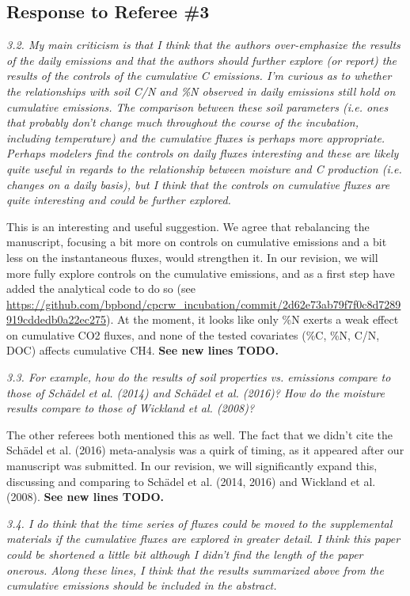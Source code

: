 \documentclass[11pt, oneside]{article}
\begin{document}
\newpage
\subsection*{Response to Referee \#3}

{\it 3.2. My main criticism is that I think that the authors over-emphasize the results of the daily emissions and that the authors should further explore (or report) the results of the controls of the cumulative C emissions. I'm curious as to whether the relationships with soil C/N and \%N observed in daily emissions still hold on cumulative emissions. The comparison between these soil parameters (i.e. ones that probably don't change much throughout the course of the incubation, including temperature) and the cumulative fluxes is perhaps more appropriate. Perhaps modelers find the controls on daily fluxes interesting and these are likely quite useful in regards to the relationship between moisture and C production (i.e. changes on a daily basis), but I think that the controls on cumulative fluxes are quite interesting and could be further explored. }

This is an interesting and useful suggestion. We agree that rebalancing the manuscript, focusing a bit more on controls on cumulative emissions and a bit less on the instantaneous fluxes, would strengthen it. In our revision, we will more fully explore controls on the cumulative emissions, and as a first step have added the analytical code to do so (see \url{https://github.com/bpbond/cpcrw_incubation/commit/2d62e73ab79f7f0c8d7289919cddedb0a22ec275}). At the moment, it looks like only \%N exerts a weak effect on cumulative CO2 fluxes, and none of the tested covariates (\%C, \%N, C/N, DOC) affects cumulative CH4. {\bf See new lines TODO.}

\medskip
{\it 3.3. For example, how do the results of soil properties vs. emissions compare to those of Schädel et al. (2014) and Schädel et al. (2016)? How do the moisture results compare to those of Wickland et al. (2008)? }

The other referees both mentioned this as well. The fact that we didn't cite the Schädel et al. (2016) meta-analysis was a quirk of timing, as it appeared after our manuscript was submitted. In our revision, we will significantly expand this, discussing and comparing to Schädel et al. (2014, 2016) and Wickland et al. (2008). {\bf See new lines TODO.}

\medskip
{\it 3.4. I do think that the time series of fluxes could be moved to the supplemental materials if the cumulative fluxes are explored in greater detail. I think this paper could be shortened a little bit although I didn't find the length of the paper onerous. Along these lines, I think that the results summarized above from the cumulative emissions should be included in the abstract. }
\end{document}
